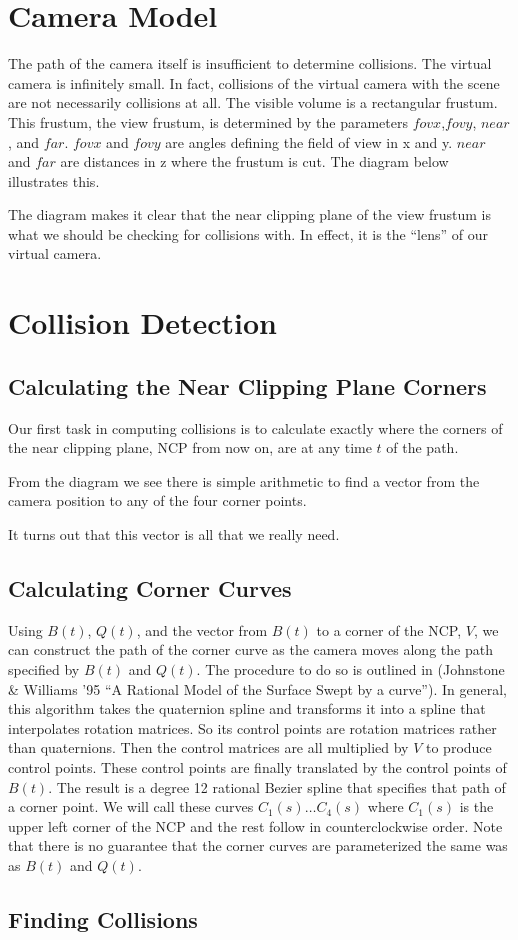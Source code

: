 \documentclass[12pt]{article}
\begin{document}
\section{Camera Model}
The path of the camera itself is insufficient to determine collisions.
The virtual camera is infinitely small.
In fact, collisions of the virtual camera with the scene are not necessarily
collisions at all.
The visible volume is a rectangular frustum.
This frustum, the view frustum, is determined by the parameters $fovx$,$ fovy$,
$near$, and $far$.
$fovx$ and $fovy$ are angles defining the field of view in x and y.
$near$ and $far$ are distances in z where the frustum is cut.
The diagram below illustrates this.


The diagram makes it clear that the near clipping plane of the view frustum
is what we should be checking for collisions with.
In effect, it is the ``lens'' of our virtual camera.
\section{Collision Detection}
\subsection{Calculating the Near Clipping Plane Corners}
Our first task in computing collisions is to calculate exactly where the
corners of the near clipping plane, NCP from now on, are at any time $t$ of the
path.


From the diagram we see there is simple arithmetic to find a vector from the
camera position to any of the four corner points.


It turns out that this vector is all that we really need.
\subsection{Calculating Corner Curves}
Using $B(t)$, $Q(t)$, and the vector from $B(t)$ to a corner of the NCP, $V$,
we can construct the path of the corner curve as the camera moves along the
path specified by $B(t)$ and $Q(t)$.
The procedure to do so is outlined in (Johnstone \& Williams '95 
``A Rational Model of the Surface Swept by a curve'').
In general, this algorithm takes the quaternion spline and transforms it into a
spline that interpolates rotation matrices.
So its control points are rotation matrices rather than quaternions.
Then the control matrices are all multiplied by $V$ to produce control points.
These control points are finally translated by the control points of $B(t)$.
The result is a degree 12 rational Bezier spline that specifies that path
of a corner point.
We will call these curves $C_{1}(s) \ldots C_{4}(s)$ where $C_{1}(s)$ is the 
upper left corner of the NCP and the rest follow in counterclockwise order.
Note that there is no guarantee that the corner curves are parameterized the
same was as $B(t)$ and $Q(t)$.
\subsection{Finding Collisions}
\end{document}
